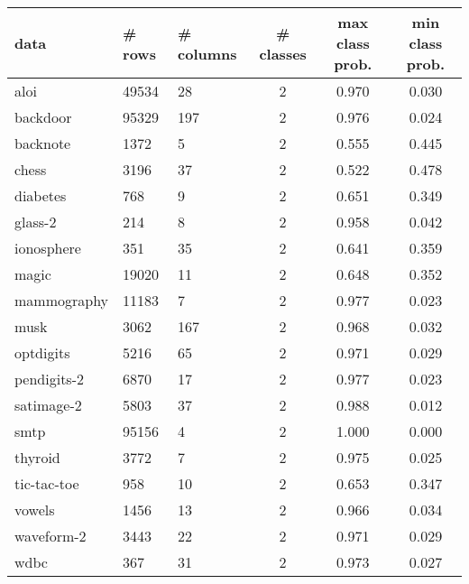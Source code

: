 \begin{table}[ht]
\centering
\begin{tabular}{l|llccc}
  \hline
data & \# rows & \# columns & \# classes & max class prob. & min class prob. \\ 
  \hline
aloi & 49534 &   28 &    2 & 0.970 & 0.030 \\ 
  backdoor & 95329 &  197 &    2 & 0.976 & 0.024 \\ 
  backnote & 1372 &    5 &    2 & 0.555 & 0.445 \\ 
  chess & 3196 &   37 &    2 & 0.522 & 0.478 \\ 
  diabetes &  768 &    9 &    2 & 0.651 & 0.349 \\ 
  glass-2 &  214 &    8 &    2 & 0.958 & 0.042 \\ 
  ionosphere &  351 &   35 &    2 & 0.641 & 0.359 \\ 
  magic & 19020 &   11 &    2 & 0.648 & 0.352 \\ 
  mammography & 11183 &    7 &    2 & 0.977 & 0.023 \\ 
  musk & 3062 &  167 &    2 & 0.968 & 0.032 \\ 
  optdigits & 5216 &   65 &    2 & 0.971 & 0.029 \\ 
  pendigits-2 & 6870 &   17 &    2 & 0.977 & 0.023 \\ 
  satimage-2 & 5803 &   37 &    2 & 0.988 & 0.012 \\ 
  smtp & 95156 &    4 &    2 & 1.000 & 0.000 \\ 
  thyroid & 3772 &    7 &    2 & 0.975 & 0.025 \\ 
  tic-tac-toe &  958 &   10 &    2 & 0.653 & 0.347 \\ 
  vowels & 1456 &   13 &    2 & 0.966 & 0.034 \\ 
  waveform-2 & 3443 &   22 &    2 & 0.971 & 0.029 \\ 
  wdbc &  367 &   31 &    2 & 0.973 & 0.027 \\ 
  \hline
  

\end{tabular}
\end{table}

